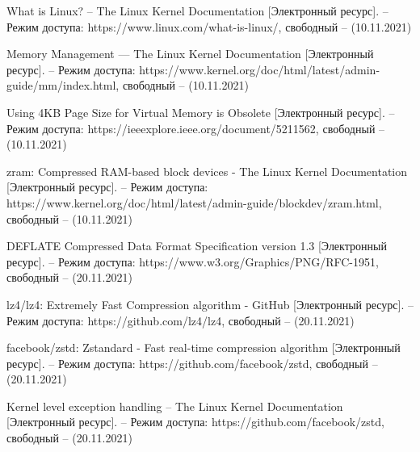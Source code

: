 \begin{thebibliography}{}
	 What is Linux? -- The Linux Kernel Documentation [Электронный ресурс]. – Режим доступа: https://www.linux.com/what-is-linux/, свободный – (10.11.2021)
	
	Memory Management — The Linux Kernel Documentation [Электронный ресурс]. – Режим доступа: https://www.kernel.org/doc/html/latest/admin-guide/mm/index.html, свободный – (10.11.2021)
	
	Using 4KB Page Size for Virtual Memory is Obsolete [Электронный ресурс]. – Режим доступа: https://ieeexplore.ieee.org/document/5211562, свободный – (10.11.2021)
	
	zram: Compressed RAM-based block devices - The Linux Kernel Documentation [Электронный ресурс]. – Режим доступа: https://www.kernel.org/doc/html/latest/admin-guide/blockdev/zram.html, свободный – (10.11.2021)
	
	DEFLATE Compressed Data Format Specification version 1.3 [Электронный ресурс]. – Режим доступа: https://www.w3.org/Graphics/PNG/RFC-1951, свободный – (20.11.2021)
	
	lz4/lz4: Extremely Fast Compression algorithm - GitHub [Электронный ресурс]. – Режим доступа: https://github.com/lz4/lz4, свободный – (20.11.2021)
	
	facebook/zstd: Zstandard - Fast real-time compression algorithm [Электронный ресурс]. – Режим доступа: https://github.com/facebook/zstd, свободный – (20.11.2021)
	
	Kernel level exception handling -- The Linux Kernel Documentation [Электронный ресурс]. – Режим доступа: https://github.com/facebook/zstd, свободный – (20.11.2021)
	
\end{thebibliography}
\endgroup

\pagebreak